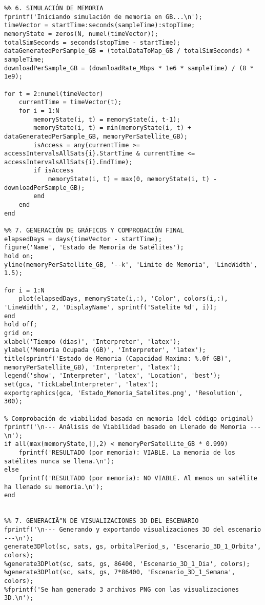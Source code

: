 \begin{verbatim}
%% 6. SIMULACIÓN DE MEMORIA
fprintf('Iniciando simulación de memoria en GB...\n');
timeVector = startTime:seconds(sampleTime):stopTime;
memoryState = zeros(N, numel(timeVector));
totalSimSeconds = seconds(stopTime - startTime);
dataGeneratedPerSample_GB = (totalDataToMap_GB / totalSimSeconds) * sampleTime;
downloadPerSample_GB = (downloadRate_Mbps * 1e6 * sampleTime) / (8 * 1e9);

for t = 2:numel(timeVector)
    currentTime = timeVector(t);
    for i = 1:N
        memoryState(i, t) = memoryState(i, t-1);
        memoryState(i, t) = min(memoryState(i, t) + dataGeneratedPerSample_GB, memoryPerSatellite_GB);
        isAccess = any(currentTime >= accessIntervalsAllSats{i}.StartTime & currentTime <= accessIntervalsAllSats{i}.EndTime);
        if isAccess
            memoryState(i, t) = max(0, memoryState(i, t) - downloadPerSample_GB);
        end
    end
end

%% 7. GENERACIÓN DE GRÁFICOS Y COMPROBACIÓN FINAL
elapsedDays = days(timeVector - startTime);
figure('Name', 'Estado de Memoria de Satélites');
hold on;
yline(memoryPerSatellite_GB, '--k', 'Limite de Memoria', 'LineWidth', 1.5);

for i = 1:N
    plot(elapsedDays, memoryState(i,:), 'Color', colors(i,:), 'LineWidth', 2, 'DisplayName', sprintf('Satelite %d', i));
end
hold off;
grid on;
xlabel('Tiempo (días)', 'Interpreter', 'latex');
ylabel('Memoria Ocupada (GB)', 'Interpreter', 'latex');
title(sprintf('Estado de Memoria (Capacidad Maxima: %.0f GB)', memoryPerSatellite_GB), 'Interpreter', 'latex');
legend('show', 'Interpreter', 'latex', 'Location', 'best');
set(gca, 'TickLabelInterpreter', 'latex');
exportgraphics(gca, 'Estado_Memoria_Satelites.png', 'Resolution', 300);

% Comprobación de viabilidad basada en memoria (del código original)
fprintf('\n--- Análisis de Viabilidad basado en Llenado de Memoria ---\n');
if all(max(memoryState,[],2) < memoryPerSatellite_GB * 0.999)
    fprintf('RESULTADO (por memoria): VIABLE. La memoria de los satélites nunca se llena.\n');
else
    fprintf('RESULTADO (por memoria): NO VIABLE. Al menos un satélite ha llenado su memoria.\n');
end


%% 7. GENERACIÃ“N DE VISUALIZACIONES 3D DEL ESCENARIO
fprintf('\n--- Generando y exportando visualizaciones 3D del escenario ---\n');
generate3DPlot(sc, sats, gs, orbitalPeriod_s, 'Escenario_3D_1_Orbita', colors);
%generate3DPlot(sc, sats, gs, 86400, 'Escenario_3D_1_Dia', colors);
%generate3DPlot(sc, sats, gs, 7*86400, 'Escenario_3D_1_Semana', colors);
%fprintf('Se han generado 3 archivos PNG con las visualizaciones 3D.\n');


\end{verbatim}
